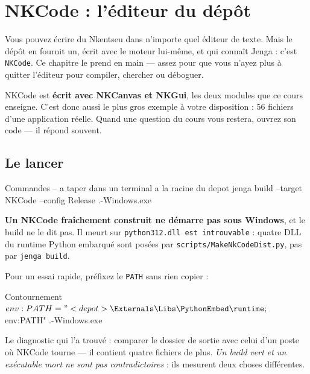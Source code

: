 \chapter{NKCode : l'éditeur du dépôt}

Vous pouvez écrire du Nkentseu dans n'importe quel éditeur de texte. Mais le
dépôt en fournit un, écrit avec le moteur lui-même, et qui connaît Jenga : c'est
\texttt{NKCode}. Ce chapitre le prend en main --- assez pour que vous n'ayez plus
à quitter l'éditeur pour compiler, chercher ou déboguer.

\begin{nkretenir}
NKCode est \textbf{écrit avec NKCanvas et NKGui}, les deux modules que ce cours
enseigne. C'est donc aussi le plus gros exemple à votre disposition : 56 fichiers
d'une application réelle. Quand une question du cours vous restera, ouvrez son
code --- il répond souvent.
\end{nkretenir}

\section{Le lancer}

\begin{nkcode}{Commandes -- a taper dans un terminal a la racine du depot}
jenga build --target NKCode --config Release
.\Build\Bin\Release-Windows\NKCode\NKCode.exe
\end{nkcode}

\begin{nkpiege}
\textbf{Un NKCode fraîchement construit ne démarre pas sous Windows}, et le build
ne le dit pas. Il meurt sur \texttt{python312.dll est introuvable} : quatre DLL
du runtime Python embarqué sont posées par \texttt{scripts/MakeNkCodeDist.py},
pas par \texttt{jenga build}.

Pour un essai rapide, préfixez le \texttt{PATH} sans rien copier :

\begin{nkcode}{Contournement}
$env:PATH = "<depot>\Externals\Libs\PythonEmbed\runtime;$env:PATH"
.\Build\Bin\Release-Windows\NKCode\NKCode.exe
\end{nkcode}

Le diagnostic qui l'a trouvé : comparer le dossier de sortie avec celui d'un
poste où NKCode tourne --- il contient quatre fichiers de plus. \emph{Un build
vert et un exécutable mort ne sont pas contradictoires} : ils mesurent deux
choses différentes.
\end{nkpiege}

